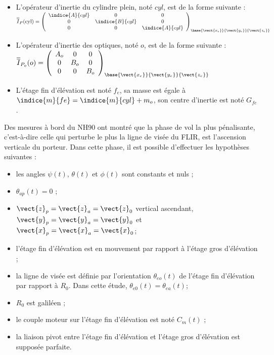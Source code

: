 \begin{itemize}
\item L'opérateur d'inertie du cylindre plein, noté $cyl$, est de la forme suivante :
$
\overline{\overline{I}}_P(\text{cyl})=
\left(
\begin{array}{ccc}
\indice{A}{cyl} & 0 & 0 \\ 
0 & \indice{B}{cyl} & 0 \\ 
0 & 0 & \indice{A}{cyl}
\end{array}
\right)_{\base{\vect{x_e}}{\vect{y_e}}{\vect{z_e}}} 
$
\item L'opérateur d'inertie des optiques, noté $o$, est de la forme suivante :
$
\overline{\overline{I}}_{P_o}(o)=
\left(
\begin{array}{ccc}
A_{o} & 0 & 0 \\ 
0 & B_{o} & 0 \\ 
0 & 0 & B_{o}
\end{array}
\right)_{\base{\vect{x_e}}{\vect{y_e}}{\vect{z_e}}} 
$
\item L'étage fin d'élévation est noté $f_e$, sa masse est égale à $\indice{m}{fe}=\indice{m}{cyl}+m_o$, son centre d'inertie est noté $G_{fe}$.
\end{itemize}


Des mesures à bord du NH90 ont montré que la phase de vol la plus pénalisante, c'est-à-dire celle qui perturbe
le plus la ligne de visée du FLIR, est l'ascension verticale du porteur. Dans cette phase, il est possible d'effectuer
les hypothèses suivantes :
\begin{itemize}
\item les angles $\psi(t)$, $\theta(t)$ et $\phi(t)$ sont constants et nuls ;
\item $\theta_{ap}(t)=0$ ;
\item $\vect{z}_p=\vect{z}_a=\vect{z}_0$ vertical ascendant, $\vect{y}_p=\vect{y}_a=\vect{y}_0$ et $\vect{x}_p=\vect{x}_a=\vect{x}_0$;
\item l'étage fin d'élévation est en mouvement par rapport à l'étage gros d'élévation ;
\item la ligne de visée est définie par l'orientation $\theta_{eo}(t)$ de l'étage fin d'élévation par rapport à $R_0$. Dans cette
étude, $\theta_{e0}(t)=\theta_{ea}(t)$;
\item $R_0$ est galiléen ;
\item le couple moteur sur l'étage fin d'élévation est noté $C_m(t)$ ;
\item la liaison pivot entre l'étage fin d'élévation et l'étage gros d'élévation est supposée parfaite.
\end{itemize}

